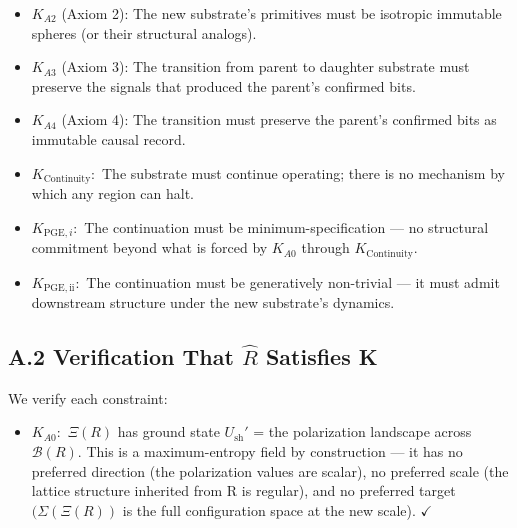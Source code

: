 \documentclass[11pt,oneside]{report}
\theoremstyle{definition}
\theoremstyle{remark}
\begin{document}
\begin{itemize}
\item
  \ensuremath{K_{A2}} (Axiom 2): The new substrate's primitives must be isotropic
  immutable spheres (or their structural analogs).
\end{itemize}

\begin{itemize}
\item
  \ensuremath{K_{A3}} (Axiom 3): The transition from parent to daughter substrate must
  preserve the signals that produced the parent's confirmed bits.
\end{itemize}

\begin{itemize}
\item
  \ensuremath{K_{A4}} (Axiom 4): The transition must preserve the parent's confirmed
  bits as immutable causal record.
\end{itemize}

\begin{itemize}
\item
  \ensuremath{K_{\mathrm{Continuity}}:} The substrate must continue operating; there is no
  mechanism by which any region can halt.
\end{itemize}

\begin{itemize}
\item
  \ensuremath{K_{\mathrm{PGE},i}:} The continuation must be minimum-specification --- no
  structural commitment beyond what is forced by \ensuremath{K_{A0}} through
  \ensuremath{K_{\mathrm{Continuity}}.}
\end{itemize}

\begin{itemize}
\item
  \ensuremath{K_{\mathrm{PGE},\mathrm{ii}}:} The continuation must be generatively non-trivial --- it
  must admit downstream structure under the new substrate's dynamics.
\end{itemize}

\subsection*{A.2 Verification That \ensuremath{\hat{R}} Satisfies K}

We verify each constraint:

\begin{itemize}
\item
  \ensuremath{K_{A0}:} \ensuremath{\Xi (R)} has ground state \ensuremath{U_{\mathrm{sh}}'} = the polarization landscape across
  \ensuremath{\mathcal{B}(R).} This is a maximum-entropy field by construction --- it has no
  preferred direction (the polarization values are scalar), no preferred
  scale (the lattice structure inherited from R is regular), and no
  preferred target \ensuremath{(\Sigma (\Xi (R))} is the full configuration space at the new
  scale). \ensuremath{\checkmark}
\end{itemize}
\end{document}
